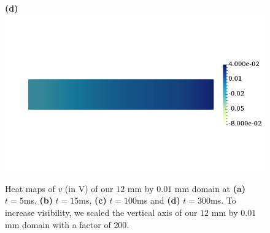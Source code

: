 \documentclass[12pt,a4paper]{article}
\begin{document}
\begin{figure}
\begin{minipage}{0.47\textwidth}
  \textbf{(d)} \includegraphics[trim=0cm 4cm 0cm 4cm, clip=true, width=0.9\linewidth]{v300}
    \end{minipage}
    \caption{Heat maps of $v$ (in V) of our $12$ mm by $0.01$ mm domain at \textbf{(a)} $t=5$ms, \textbf{(b)} $t=15$ms, \textbf{(c)} $t=100$ms and \textbf{(d)} $t=300$ms. To increase visibility, we scaled the vertical axis of our $12$ mm by $0.01$ mm domain with a factor of $200$.}
    \label{fig:1}
\end{figure}
%
\end{document}
